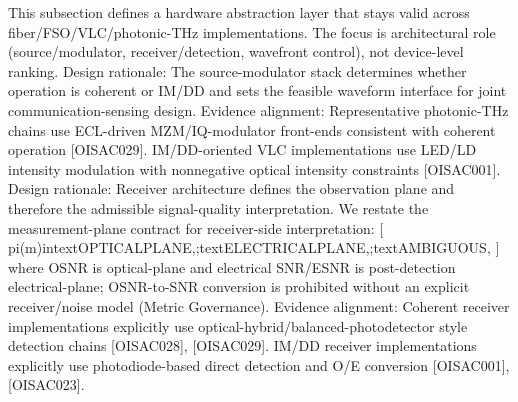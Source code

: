 {}This subsection defines a hardware abstraction layer that stays valid across fiber/FSO/VLC/photonic-THz implementations. The focus is architectural role (source/modulator, receiver/detection, wavefront control), not device-level ranking.\markdownRendererInterblockSeparator
{}\markdownRendererSectionBegin
{}\markdownRendererInterblockSeparator
{}Design rationale: The source-modulator stack determines whether operation is coherent or IM/DD and sets the feasible waveform interface for joint communication-sensing design.\markdownRendererParagraphSeparator
{}Evidence alignment: Representative photonic-THz chains use ECL-driven MZM/IQ-modulator front-ends consistent with coherent operation [O\markdownRendererUnderscore{}ISAC\markdownRendererUnderscore{}029]. IM/DD-oriented VLC implementations use LED/LD intensity modulation with nonnegative optical intensity constraints [O\markdownRendererUnderscore{}ISAC\markdownRendererUnderscore{}001].\markdownRendererInterblockSeparator
{}
\markdownRendererSectionEnd \markdownRendererSectionBegin
{}\markdownRendererInterblockSeparator
{}Design rationale: Receiver architecture defines the observation plane and therefore the admissible signal-quality interpretation.\markdownRendererParagraphSeparator
{}We restate the measurement-plane contract for receiver-side interpretation:\markdownRendererSoftLineBreak
{}[\markdownRendererSoftLineBreak
{}\markdownRendererBackslash{}pi(m)\markdownRendererBackslash{}in\markdownRendererLeftBrace{}\markdownRendererBackslash{}text\markdownRendererLeftBrace{}OPTICAL\markdownRendererUnderscore{}PLANE\markdownRendererRightBrace{},;\markdownRendererBackslash{}text\markdownRendererLeftBrace{}ELECTRICAL\markdownRendererUnderscore{}PLANE\markdownRendererRightBrace{},;\markdownRendererBackslash{}text\markdownRendererLeftBrace{}AMBIGUOUS\markdownRendererRightBrace{}\markdownRendererRightBrace{},\markdownRendererSoftLineBreak
{}]\markdownRendererSoftLineBreak
{}where OSNR is optical-plane and electrical SNR/ESNR is post-detection electrical-plane; OSNR-to-SNR conversion is prohibited without an explicit receiver/noise model (Metric Governance).\markdownRendererParagraphSeparator
{}Evidence alignment: Coherent receiver implementations explicitly use optical-hybrid/balanced-photodetector style detection chains [O\markdownRendererUnderscore{}ISAC\markdownRendererUnderscore{}028], [O\markdownRendererUnderscore{}ISAC\markdownRendererUnderscore{}029]. IM/DD receiver implementations explicitly use photodiode-based direct detection and O/E conversion [O\markdownRendererUnderscore{}ISAC\markdownRendererUnderscore{}001], [O\markdownRendererUnderscore{}ISAC\markdownRendererUnderscore{}023].\markdownRendererInterblockSeparator
